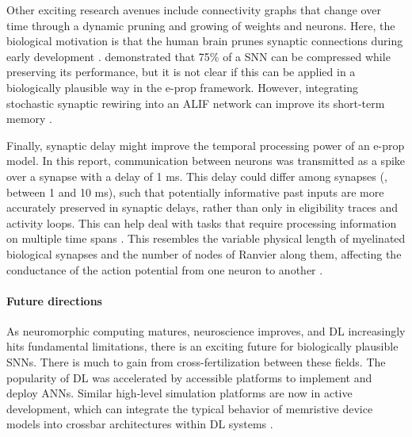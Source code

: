     Other exciting research avenues include connectivity graphs that change over time through a dynamic pruning and growing of weights and neurons.
    Here, the biological motivation is that the human brain prunes synaptic connections during early development \citep{huttenlocher1979synaptic}.
    \citet{elbez2020progressive} demonstrated that 75\% of a SNN can be compressed while preserving its performance, but it is not clear if this can be applied in a biologically plausible way in the e-prop framework.
    However, integrating stochastic synaptic rewiring \citep{kappel2018dynamic} into an ALIF network can improve its short-term memory \citep{bellec2020solution}.

    Finally, synaptic delay might improve the temporal processing power of an e-prop model.
    In this report, communication between neurons was transmitted as a spike over a synapse with a delay of 1 ms.
    This delay could differ among synapses (\eg, between 1 and 10 ms), such that potentially informative past inputs are more accurately preserved in synaptic delays, rather than only in eligibility traces and activity loops.
    This can help deal with tasks that require processing information on multiple time spans \citep{jaeger2021dimensions}.
    This resembles the variable physical length of myelinated biological synapses and the number of nodes of Ranvier along them, affecting the conductance of the action potential from one neuron to another \citep{bean2007action}.


\paragraph{Future directions}
    As neuromorphic computing matures, neuroscience improves, and DL increasingly hits fundamental limitations, there is an exciting future for biologically plausible SNNs.
    There is much to gain from cross-fertilization between these fields.
    The popularity of DL was accelerated by accessible platforms to implement and deploy ANNs.
    Similar high-level simulation platforms are now in active development, which can integrate the typical behavior of memristive device models into crossbar architectures within DL systems \citep{lammie2020memtorch}.

